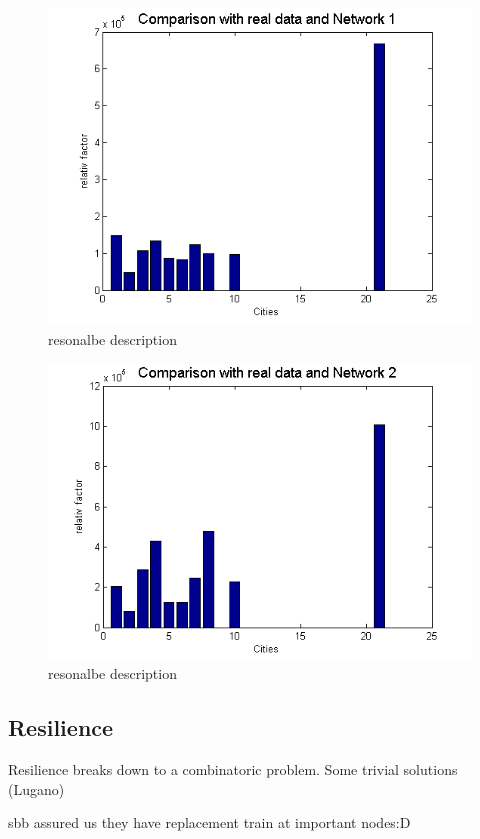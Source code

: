 \documentclass[11pt]{article}
\begin{document}
\begin{figure}
\includegraphics[scale=0.5]{compare1}
 \caption{resonalbe description}
\end{figure}

\begin{figure}
\includegraphics[scale=0.5]{compare2}
 \caption{resonalbe description}
\end{figure}



\subsection{Resilience}
 Resilience breaks down to a combinatoric problem. Some trivial solutions (Lugano)
 
 sbb assured us they have replacement train at important nodes:D
\end{document}
